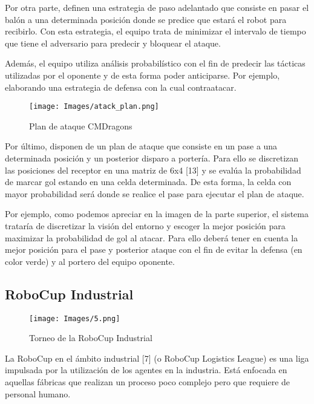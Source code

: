 \documentclass[11pt,oneside,a4paper]{book}
\begin{document}
Por otra parte, definen una estrategia de paso adelantado que consiste en pasar el balón a una determinada posición donde se predice que estará el robot para recibirlo. Con esta estrategia, el equipo trata de minimizar el intervalo de tiempo que tiene el adversario para predecir y bloquear el ataque.

Además, el equipo utiliza análisis probabilístico con el fin de predecir las tácticas utilizadas por el oponente y de esta forma poder anticiparse. Por ejemplo, elaborando una estrategia de defensa con la cual contraatacar.

\begin{figure}[H]
\begin{center}
\texttt{[image: Images/atack\_plan.png]}
\caption{Plan de ataque CMDragons}
\end{center}
\end{figure}

Por último, disponen de un plan de ataque que consiste en un pase a una determinada posición y un posterior disparo a portería. Para ello se discretizan las posiciones del receptor en una matriz de 6x4 [13] y se evalúa la probabilidad de marcar gol estando en una celda determinada. De esta forma, la celda con mayor probabilidad será donde se realice el pase para ejecutar el plan de ataque.

Por ejemplo, como podemos apreciar en la imagen de la parte superior, el sistema trataría de discretizar la visión del entorno y escoger la mejor posición para maximizar la probabilidad de gol al atacar. Para ello deberá tener en cuenta la mejor posición para el pase y posterior ataque con el fin de evitar la defensa (en color verde) y al portero del equipo oponente.



\subsection{RoboCup  Industrial}
\begin{figure}[H]
\begin{center}
\texttt{[image: Images/5.png]}
\caption{Torneo de la RoboCup Industrial}
\end{center}
\end{figure}
La RoboCup en el ámbito industrial [7] (o RoboCup Logistics League) es una liga impulsada por la utilización de los agentes en la industria. Está enfocada en aquellas fábricas que realizan un proceso poco complejo pero que requiere de personal humano.
\end{document}
